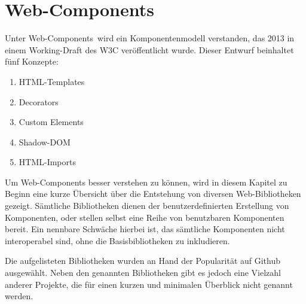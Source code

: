 \section{Web-Components}
\label{sec:3_W3C}

Unter \glqq Web-Components\grqq\ wird ein Komponentenmodell verstanden, das 2013 in einem Working-Draft des W3C veröffentlicht wurde. Dieser Entwurf beinhaltet fünf Konzepte:
\begin{enumerate}
\item HTML-Templates
\item Decorators
\item Custom Elements
\item Shadow-DOM
\item HTML-Imports
\end{enumerate}

Um Web-Components besser verstehen zu können, wird in diesem Kapitel zu Beginn eine kurze Übersicht über die Entstehung von diversen Web-Bibliotheken gezeigt. Sämtliche Bibliotheken dienen der benutzerdefinierten Erstellung von Komponenten, oder stellen selbst eine Reihe von benutzbaren Komponenten bereit. Ein nennbare Schwäche hierbei ist, das sämtliche Komponenten nicht interoperabel sind, ohne die Basisbibliotheken zu inkludieren.

Die aufgelisteten Bibliotheken wurden an Hand der Popularität auf Github ausgewählt. Neben den genannten Bibliotheken gibt es jedoch eine Vielzahl anderer Projekte, die für einen kurzen und minimalen Überblick nicht genannt werden.

